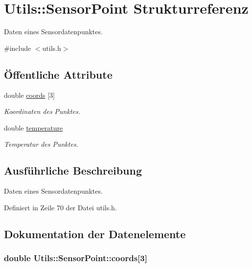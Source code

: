 \hypertarget{structUtils_1_1SensorPoint}{\section{Utils\-:\-:Sensor\-Point Strukturreferenz}
\label{structUtils_1_1SensorPoint}
}


Daten eines Sensordatenpunktes.  




{\ttfamily \#include $<$utils.\-h$>$}

\subsection*{Öffentliche Attribute}
\begin{DoxyCompactItemize}
\item 
double \hyperlink{structUtils_1_1SensorPoint_aedff5493c2f6c36e9552dc3807c8ce24}{coords} \mbox{[}3\mbox{]}
\begin{DoxyCompactList}\small\item\em Koordinaten des Punktes. \end{DoxyCompactList}\item 
double \hyperlink{structUtils_1_1SensorPoint_a764d6572f865138b36cb46c910001e9a}{temperature}
\begin{DoxyCompactList}\small\item\em Temperatur des Punktes. \end{DoxyCompactList}\end{DoxyCompactItemize}


\subsection{Ausführliche Beschreibung}
Daten eines Sensordatenpunktes. 

Definiert in Zeile 70 der Datei utils.\-h.



\subsection{Dokumentation der Datenelemente}
\hypertarget{structUtils_1_1SensorPoint_aedff5493c2f6c36e9552dc3807c8ce24}{
\subsubsection[{coords}]{\setlength{\rightskip}{0pt plus 5cm}double Utils\-::\-Sensor\-Point\-::coords\mbox{[}3\mbox{]}}}\label{structUtils_1_1SensorPoint_aedff5493c2f6c36e9552dc3807c8ce24}


